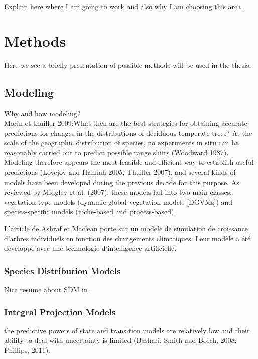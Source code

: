 Explain here where I am going to work and also why I am choosing this area.

\section{Methods}

Here we see a briefly presentation of possible methods will be used in the thesis.

\subsection{Modeling}

Why and how modeling?\\
Morin et thuiller 2009:{What then are the best strategies for obtaining accurate predictions for changes in the distributions of deciduous temperate trees? At the scale of the geographic distribution of species, no experiments in situ can be reasonably carried out to predict possible range shifts (Woodward 1987). Modeling therefore appears the most feasible and efficient way to establish useful predictions (Lovejoy and Hannah 2005, Thuiller 2007), and several kinds of models have been developed during the previous decade for this purpose. As reviewed by Midgley et al. (2007), these models fall into two main classes: vegetation-type models (dynamic global vegetation models [DGVMs]) and species-specific models (niche-based and process-based).}

 L’article de Ashraf et Maclean porte sur un modèle de simulation de croissance d’arbres individuels en fonction des changements climatiques.  Leur modèle a été développé avec une technologie d’intelligence artificielle.

\subsubsection{Species Distribution Models}\label{sdm}

Nice resume about SDM in \citet{Moran-Ordonez2016}.

\subsubsection{Integral Projection Models}

the predictive powers of state and transition models are relatively low and their ability to deal with uncertainty is limited (Bashari, Smith and Bosch, 2008; Phillips, 2011).

